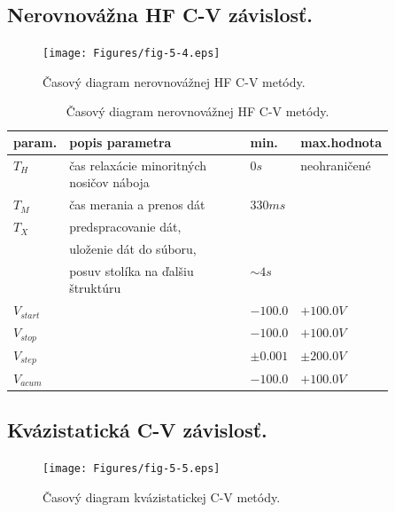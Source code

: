 \newpage
\subsection{Nerovnovážna HF C-V závislosť.}\label{sec:5.4.2}

\begin{figure}[h!]\centering
  \texttt{[image: Figures/fig-5-4.eps]}
  \caption[Časový diagram nerovnovážnej HF C-V metódy]{Časový diagram
    nerovnovážnej HF C-V metódy.}\label{fig:5.4}
\end{figure}

\begin{table}[h!]\centering
  \begin{tabular}{l p{0.5\linewidth} l l}
    param.      & popis parametra & min. & max.hodnota\\
    \hline
    $T_H$       & čas relaxácie minoritných nosičov náboja \dotfill & $0 s$ &  neohraničené\\
    $T_M$       & čas merania a prenos dát \dotfill & $330 ms$\\
    $T_X$       & predspracovanie dát,\\
                & uloženie dát do súboru,\\
                & posuv stolíka na ďalšiu štruktúru \dotfill & $\sim 4s$\\
    $V_{start}$ & \dotfill & $-100.0$ & $+100.0 V$\\
    $V_{stop}$  & \dotfill & $-100.0$ & $+100.0 V$\\
    $V_{step}$  & \dotfill & $\pm 0.001$ & $\pm 200.0 V$\\
    $V_{acum}$  & \dotfill & $-100.0$ & $+100.0 V$\\
    \hline
  \end{tabular}
  \caption[Časový diagram nerovnovážnej HF C-V metódy]{Časový diagram
    nerovnovážnej HF C-V metódy.}\label{tab:5.2}
\end{table}

\newpage
\subsection{Kvázistatická C-V závislosť.}\label{sec:5.4.3}

\begin{figure}[h!]\centering
  \texttt{[image: Figures/fig-5-5.eps]}
  \caption[Časový diagram kvázistatickej C-V metódy]{Časový diagram
    kvázistatickej C-V metódy.}\label{fig:5.5}
\end{figure}

